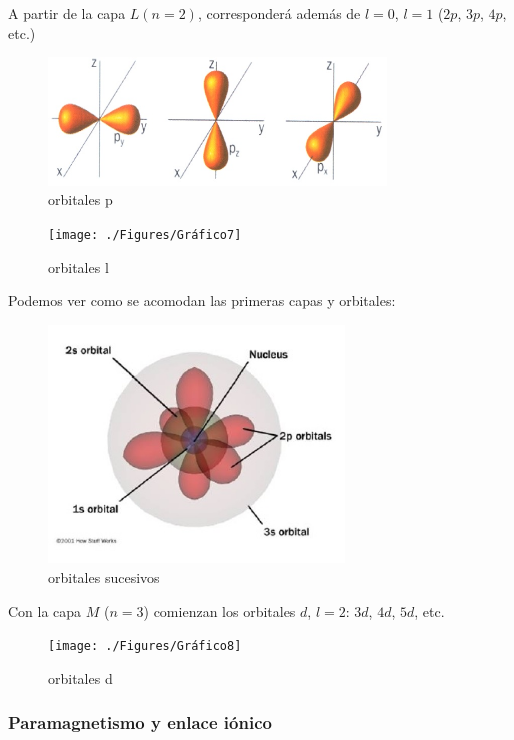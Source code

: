 A partir de la capa $L (n=2)$, corresponderá además de $l=0$, $l= 1$ ($2p$, $3p$, $4p$, etc.)


\begin{figure}[H]
    \centering
    \includegraphics[width=0.8\textwidth]{./Figures/OrbitalesP}
	\caption{orbitales p}
	\label{fig:GraficoOrbitalesP}
\end{figure}

\begin{figure}[H]
    \centering
    \texttt{[image: ./Figures/Gráfico7]}
	\caption{orbitales l}
	\label{fig:Grafico7}
\end{figure}

Podemos ver como se acomodan las primeras capas y orbitales:

\begin{figure}[H]
    \centering
    \includegraphics[width=0.7\textwidth]{./Figures/variosOrbitales}
	\caption{orbitales sucesivos}
	\label{fig:variosOrbitales}
\end{figure}

Con la capa $M$ ($n=3$) comienzan los orbitales $d$, $l=2$: $3d$, $4d$, $5d$, etc.

\begin{figure}[H]
    \centering
    \texttt{[image: ./Figures/Gráfico8]}
	\caption{orbitales d}
	\label{fig:Grafico8}
\end{figure}


\subsubsection{Paramagnetismo y enlace iónico}

